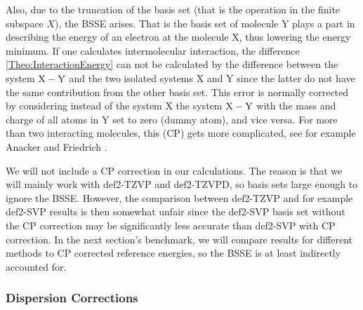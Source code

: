 \documentclass[8.5pt,twoside,twocolumn]{article}
\theoremstyle{standard}
\begin{document}
Also, due to the truncation of the basis set (that is the operation in the finite subspace $X$),
the  BSSE arises. That is the basis set of molecule Y plays a
part in describing the energy of an electron at the molecule X, thus lowering the energy minimum.
If one calculates intermolecular interaction, the difference \eqref{Theo:InteractionEnergy} 
can not be calculated by the difference between the system ${{\text X - \text Y}}$ and the two isolated systems
X and Y since the latter do not have the same contribution from the other basis set.
This error is normally corrected by considering instead of the system X the system ${{\text X - \text Y}}$
with the mass and charge of all atoms in Y set to zero (dummy atom), and vice versa.
For more than two interacting molecules, this  (CP) gets
more complicated, see for example Anacker and Friedrich \cite{Anacker2014}.

We will not include a CP correction in our calculations. The reason is that we will mainly
work with def2-TZVP and def2-TZVPD, so basis sets large enough to ignore the 
BSSE. However, the comparison between def2-TZVP and for example def2-SVP results
is then somewhat unfair since the def2-SVP basis set without the CP correction
may be significantly less accurate than def2-SVP with CP correction. In the next
section's benchmark, we will compare results for different methods to CP corrected reference 
energies, so the BSSE is at least indirectly accounted for.


\subsubsection{Dispersion Corrections}
\end{document}
